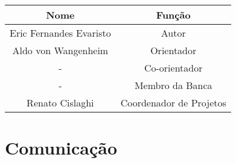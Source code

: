 \noindent \begin{tabular}{|c|c|}
	\arrayrulecolor{white}
	\hline
	\arrayrulecolor{black}
	\hline
	\rowcolor{shadecolor}
	\textbf{Nome}           & \textbf{Função}         \\ \hline
	Eric Fernandes Evaristo & Autor                   \\ \hline
	Aldo von Wangenheim     & Orientador              \\ \hline
	-                       & Co-orientador           \\ \hline
	-                       & Membro da Banca         \\ \hline
	Renato Cislaghi         & Coordenador de Projetos \\ \hline
\end{tabular}

\section{Comunicação}

